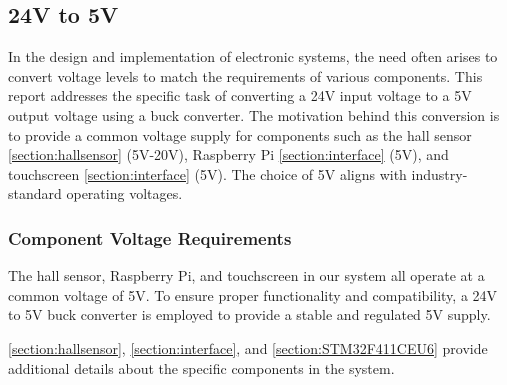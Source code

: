 \subsection{24V to 5V}
In the design and implementation of electronic systems, the need often arises to convert voltage levels to match the requirements of various components. This report addresses the specific task of converting a 24V input voltage to a 5V output voltage using a buck converter. The motivation behind this conversion is to provide a common voltage supply for components such as the hall sensor \autoref{section:hallsensor} (5V-20V), Raspberry Pi \autoref{section:interface} (5V), and touchscreen \autoref{section:interface}  (5V). The choice of 5V aligns with industry-standard operating voltages.

\subsubsection{Component Voltage Requirements}
The hall sensor, Raspberry Pi, and touchscreen in our system all operate at a common voltage of 5V. To ensure proper functionality and compatibility, a 24V to 5V buck converter is employed to provide a stable and regulated 5V supply.

\autoref{section:hallsensor}, \autoref{section:interface}, and \autoref{section:STM32F411CEU6} provide additional details about the specific components in the system.

